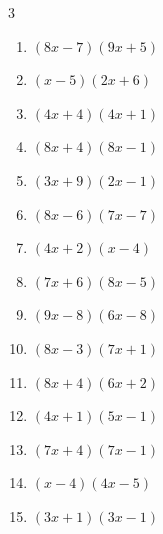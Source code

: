 \begin{multicols}{3}
\begin{enumerate}
  \item $(8x-7)(9x+5)$


  \item $(x-5)(2x+6)$


  \item $(4x+4)(4x+1)$


  \item $(8x+4)(8x-1)$


  \item $(3x+9)(2x-1)$


  \item $(8x-6)(7x-7)$


\columnbreak %

  \item $(4x+2)(x-4)$


  \item $(7x+6)(8x-5)$


  \item $(9x-8)(6x-8)$


  \item $(8x-3)(7x+1)$


  \item $(8x+4)(6x+2)$


  \item $(4x+1)(5x-1)$


  \item $(7x+4)(7x-1)$


  \item $(x-4)(4x-5)$


  \item $(3x+1)(3x-1)$


\end{enumerate}
\end{multicols}
